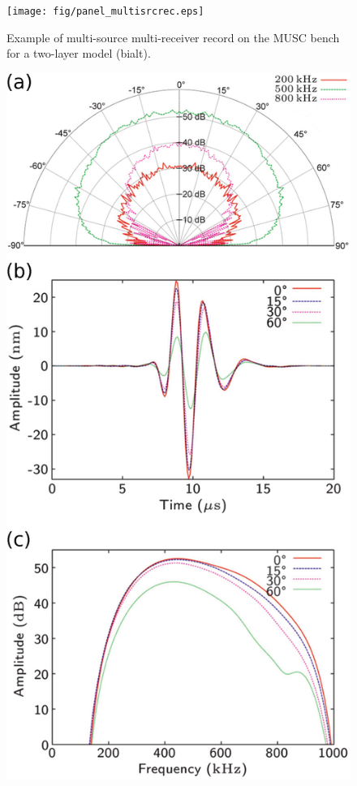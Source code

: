 \documentclass[manuscript,revised]{geophysics}
\begin{document}
\begin{figure}[!h]
	\centering
	\texttt{[image: fig/panel\_multisrcrec.eps]}
	\caption{Example of multi-source multi-receiver record on the MUSC bench for a two-layer model (bialt).}
	\label{panel_multisrcrec}
\end{figure}

\begin{figure}[!ht]
	\centering
	\includegraphics[scale=0.4]{fig/piezo-source-validation.eps}

\end{figure}
\end{document}
